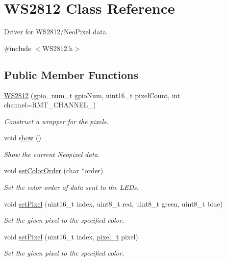 \hypertarget{class_w_s2812}{}\section{W\+S2812 Class Reference}
\label{class_w_s2812}


Driver for W\+S2812/\+Neo\+Pixel data.  




{\ttfamily \#include $<$W\+S2812.\+h$>$}

\subsection*{Public Member Functions}
\begin{DoxyCompactItemize}
\item 
\hyperlink{class_w_s2812_a873e567f57a612a0e408b5bb310d9024}{W\+S2812} (gpio\+\_\+num\+\_\+t gpio\+Num, uint16\+\_\+t pixel\+Count, int channel=R\+M\+T\+\_\+\+C\+H\+A\+N\+N\+E\+L\+\_)
\begin{DoxyCompactList}\small\item\em Construct a wrapper for the pixels. \end{DoxyCompactList}\item 
void \hyperlink{class_w_s2812_ad03797836617dccf530cb7c6423c03fe}{show} ()
\begin{DoxyCompactList}\small\item\em Show the current Neopixel data. \end{DoxyCompactList}\item 
void \hyperlink{class_w_s2812_a7a68e53534f4b1f68e447621caf0e2e6}{set\+Color\+Order} (char $\ast$order)
\begin{DoxyCompactList}\small\item\em Set the color order of data sent to the L\+E\+Ds. \end{DoxyCompactList}\item 
void \hyperlink{class_w_s2812_a60025d23e7fc21c3ce8c1f02bd50bf86}{set\+Pixel} (uint16\+\_\+t index, uint8\+\_\+t red, uint8\+\_\+t green, uint8\+\_\+t blue)
\begin{DoxyCompactList}\small\item\em Set the given pixel to the specified color. \end{DoxyCompactList}\item 
void \hyperlink{class_w_s2812_a2f37824dbf4730986d4ebde58c25a48d}{set\+Pixel} (uint16\+\_\+t index, \hyperlink{structpixel__t}{pixel\+\_\+t} pixel)
\begin{DoxyCompactList}\small\item\em Set the given pixel to the specified color. \end{DoxyCompactList}\item 

\end{DoxyCompactItemize}
